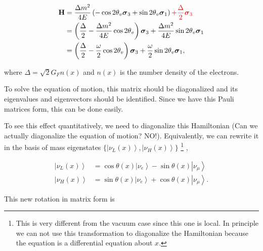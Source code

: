 \documentclass{tufte-handout}
\newcommand{\ket}[1]{\left| #1\right\rangle}
\begin{document}
\begin{align*}
\mathbf H &= \frac{ \Delta m^2 }{4E} \left( -\cos 2\theta_v \boldsymbol {\sigma}_3  + \sin 2\theta_v \boldsymbol{\sigma}_1 \right)  {\color{red} + \frac{\Delta}{2} \boldsymbol{\sigma}_3 } \\
& = \left(\frac{\Delta}{2} -\frac{ \Delta m^2 }{4E} \cos 2\theta_v \right) \boldsymbol{\sigma}_3  + \frac{ \Delta m^2 }{4E} \sin 2\theta_v \boldsymbol{\sigma}_1 \\
& = \left(\frac{\Delta}{2} -\frac{ \omega }{2} \cos 2\theta_v \right) \boldsymbol{\sigma}_3  + \frac{ \omega }{2} \sin 2\theta_v \boldsymbol{\sigma}_1,
\end{align*}

where $\Delta = \sqrt{2} G_F n(x) $ and $n(x)$ is the number density of the electrons.

To solve the equation of motion, this matrix should be diagonalized and its eigenvalues and eigenvectors should be identified. Since we have this Pauli matrices form, this can be done easily.

To see this effect quantitatively, we need to diagonalize this Hamiltonian (Can we actually diagonalize the equation of motion? NO!). Equivalently, we can rewrite it in the basis of mass eigenstates  $\{\ket{\nu_L(x)}, \ket{\nu_H(x)}\}$ \footnote{This is very different from the vacuum case since this one is local. In principle we can not use this transformation to diagonalize the Hamiltonian because the equation is a differential equation about $x$.} , 

\begin{align*}
\ket{\nu_L(x)} &= \cos\theta(x) \ket{\nu_e} - \sin\theta(x) \ket{\nu_\mu} \\
\ket{\nu_H(x)} & =  \sin\theta(x) \ket{\nu_e} + \cos\theta(x) \ket{\nu_\mu}.
\end{align*}


This new rotation in matrix form is 
\end{document}
